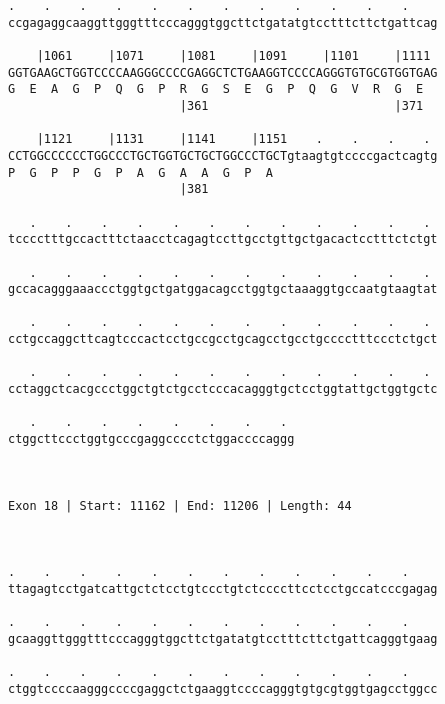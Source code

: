 \documentclass{article}
\begin{document}
\begin{Verbatim}
.    .    .    .    .    .    .    .    .    .    .    .    
ccgagaggcaaggttgggtttcccagggtggcttctgatatgtcctttcttctgattcag
                                                            
    |1061     |1071     |1081     |1091     |1101     |1111 
GGTGAAGCTGGTCCCCAAGGGCCCCGAGGCTCTGAAGGTCCCCAGGGTGTGCGTGGTGAG
G  E  A  G  P  Q  G  P  R  G  S  E  G  P  Q  G  V  R  G  E  
                        |361                          |371  
  
    |1121     |1131     |1141     |1151    .    .    .    . 
CCTGGCCCCCCTGGCCCTGCTGGTGCTGCTGGCCCTGCTgtaagtgtccccgactcagtg
P  G  P  P  G  P  A  G  A  A  G  P  A                       
                        |381                                
  
   .    .    .    .    .    .    .    .    .    .    .    . 
tcccctttgccactttctaacctcagagtccttgcctgttgctgacactcctttctctgt
                                                            
   .    .    .    .    .    .    .    .    .    .    .    . 
gccacagggaaaccctggtgctgatggacagcctggtgctaaaggtgccaatgtaagtat
                                                            
   .    .    .    .    .    .    .    .    .    .    .    . 
cctgccaggcttcagtcccactcctgccgcctgcagcctgcctgcccctttccctctgct
                                                            
   .    .    .    .    .    .    .    .    .    .    .    . 
cctaggctcacgccctggctgtctgcctcccacagggtgctcctggtattgctggtgctc
                                                            
   .    .    .    .    .    .    .    . 
ctggcttccctggtgcccgaggcccctctggaccccaggg
                                        
                                        
 
Exon 18 | Start: 11162 | End: 11206 | Length: 44



.    .    .    .    .    .    .    .    .    .    .    .    
ttagagtcctgatcattgctctcctgtccctgtctccccttcctcctgccatcccgagag
                                                            
.    .    .    .    .    .    .    .    .    .    .    .    
gcaaggttgggtttcccagggtggcttctgatatgtcctttcttctgattcagggtgaag
                                                            
.    .    .    .    .    .    .    .    .    .    .    .    
ctggtccccaagggccccgaggctctgaaggtccccagggtgtgcgtggtgagcctggcc
                                                            

\end{Verbatim}
\end{document}
